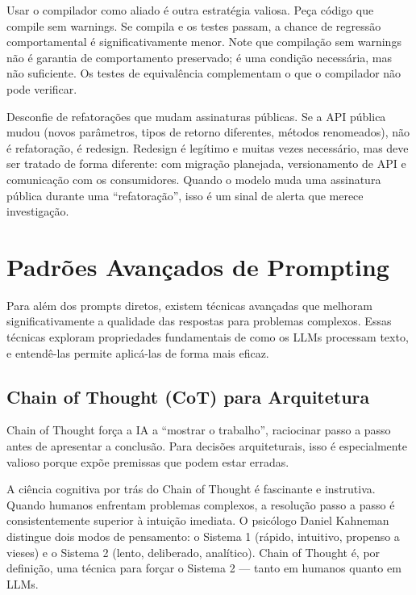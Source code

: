 Usar o compilador como aliado é outra estratégia valiosa. Peça código que compile
sem warnings. Se compila e os testes passam, a chance de regressão comportamental
é significativamente menor. Note que compilação sem warnings não é garantia de
comportamento preservado; é uma condição necessária, mas não suficiente. Os
testes de equivalência complementam o que o compilador não pode verificar.

Desconfie de refatorações que mudam assinaturas públicas. Se a API
pública mudou (novos parâmetros, tipos de retorno diferentes, métodos
renomeados), não é refatoração, é redesign. Redesign é legítimo e muitas vezes
necessário, mas deve ser tratado de forma diferente: com migração planejada,
versionamento de API e comunicação com os consumidores. Quando o modelo muda
uma assinatura pública durante uma ``refatoração'', isso é um sinal de alerta
que merece investigação.

\section{Padrões Avançados de Prompting}

Para além dos prompts diretos, existem técnicas avançadas que melhoram
significativamente a qualidade das respostas para problemas complexos. Essas
técnicas exploram propriedades fundamentais de como os LLMs processam texto,
e entendê-las permite aplicá-las de forma mais eficaz.

\subsection{Chain of Thought (CoT) para Arquitetura}

Chain of Thought força a IA a ``mostrar o trabalho'', raciocinar passo a
passo antes de apresentar a conclusão. Para decisões arquiteturais, isso é
especialmente valioso porque expõe premissas que podem estar erradas.

A ciência cognitiva por trás do Chain of Thought é fascinante e instrutiva.
Quando humanos enfrentam problemas complexos, a resolução passo a passo é
consistentemente superior à intuição imediata. O psicólogo Daniel Kahneman
distingue dois modos de pensamento: o Sistema 1 (rápido, intuitivo, propenso a
vieses) e o Sistema 2 (lento, deliberado, analítico). Chain of Thought é,
por definição, uma técnica para forçar o Sistema 2 --- tanto em humanos quanto
em LLMs.

